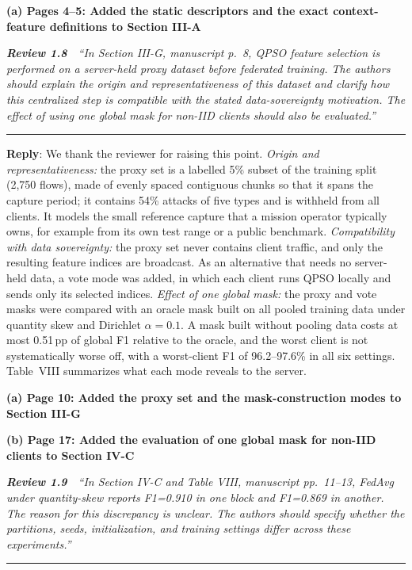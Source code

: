 \documentclass[11pt]{article}
\newcommand{\review}[2]{\par\bigskip\noindent\textbf{\textit{Review #1}}\ \ \textit{``#2''}\par\smallskip\hrule\medskip}
\newcommand{\reply}{\noindent\textbf{Reply}: }
\newcommand{\loc}[1]{\par\medskip\noindent\textbf{#1}\par}
\begin{document}
\loc{(a) Pages 4--5: Added the static descriptors and the exact context-feature definitions to Section III-A}

\review{1.8}{In Section III-G, manuscript p.~8, QPSO feature selection is performed on a server-held proxy dataset before federated training. The authors should explain the origin and representativeness of this dataset and clarify how this centralized step is compatible with the stated data-sovereignty motivation. The effect of using one global mask for non-IID clients should also be evaluated.}

\reply We thank the reviewer for raising this point. \textit{Origin and
representativeness:} the proxy set is a labelled 5\% subset of the training
split (2{,}750 flows), made of evenly spaced contiguous chunks so that it spans
the capture period; it contains 54\% attacks of five types and is withheld
from all clients. It models the small reference capture that a mission
operator typically owns, for example from its own test range or a public
benchmark. \textit{Compatibility with data sovereignty:} the proxy set never
contains client traffic, and only the resulting feature indices are
broadcast. As an alternative that needs no server-held data, a vote mode was
added, in which each client runs QPSO locally and sends only its selected
indices. \textit{Effect of one global mask:} the proxy and vote masks were
compared with an oracle mask built on all pooled training data under
quantity skew and Dirichlet $\alpha=0.1$. A mask built without pooling data
costs at most 0.51\,pp of global F1 relative to the oracle, and the worst
client is not systematically worse off, with a worst-client F1 of
96.2--97.6\% in all six settings. Table~VIII summarizes what each mode
reveals to the server.

\loc{(a) Page 10: Added the proxy set and the mask-construction modes to Section III-G}

\loc{(b) Page 17: Added the evaluation of one global mask for non-IID clients to Section IV-C}

\review{1.9}{In Section IV-C and Table VIII, manuscript pp.~11--13, FedAvg under quantity-skew reports F1=0.910 in one block and F1=0.869 in another. The reason for this discrepancy is unclear. The authors should specify whether the partitions, seeds, initialization, and training settings differ across these experiments.}
\end{document}
